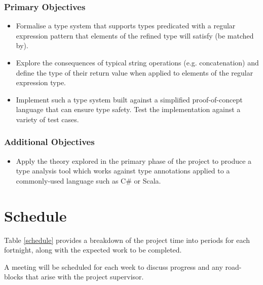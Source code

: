 \documentclass[a4paper]{article}
\begin{document}
    \subsubsection*{Primary Objectives}
    
    \begin{itemize}
        \item Formalise a type system that supports types predicated with a regular expression pattern that elements of the refined type will satisfy (be matched by).
        \item Explore the consequences of typical string operations (e.g. concatenation) and define the type of their return value when applied to elements of the regular expression type.
        \item Implement such a type system built against a simplified proof-of-concept language that can ensure type safety. Test the implementation against a variety of test cases.
    \end{itemize}

    \subsubsection*{Additional Objectives}
    
    \begin{itemize}
        \item Apply the theory explored in the primary phase of the project to produce a type analysis tool which works against type annotations applied to a commonly-used language such as C\# or Scala.
    \end{itemize}
    
    \section*{Schedule}
    
    Table \ref{schedule} provides a breakdown of the project time into periods for each fortnight, along with the expected work to be completed.
    
    A meeting will be scheduled for each week to discuss progress and any road-blocks that arise with the project supervisor.
    
\end{document}
